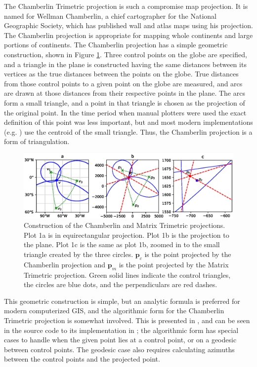 \documentclass[]{interact}
\begin{document}
The Chamberlin Trimetric projection is such a compromise map projection. It is
named for Wellman Chamberlin, a chief cartographer for the National Geographic
Society, which has published wall and atlas maps using his projection. The
Chamberlin projection is appropriate for mapping whole continents and large
portions of continents. \citep{christensen} The Chamberlin projection has a
simple geometric construction, shown in Figure \ref{fig:chamberlin}. Three
control points on the globe are specified, and a triangle in the plane is
constructed having the same distances between its vertices as the true
distances between the points on the globe. True distances from those control
points to a given point on the globe are measured, and arcs are drawn at those
distances from their respective points in the plane.
The arcs form a small triangle,
and a point in that triangle is chosen as the projection of the original
point. In the time period when manual plotters were used the exact definition
of this point was less important, but \citet{christensen} and most modern
implementations (e.g. \citealp{proj}) use the centroid of the small triangle.
Thus, the Chamberlin projection is a form of triangulation. \citep{snyder89}

\begin{figure}
  \includegraphics[width=\textwidth]{construction}
  \caption{Construction of the Chamberlin and Matrix Trimetric projections.
  Plot 1a is in equirectangular projection. Plot 1b is the projection
  to the plane. Plot 1c is the same as plot 1b, zoomed in to the small
  triangle created by the three circles. $\mathbf p_c$ is the point projected
  by the Chamberlin projection and $\mathbf p_m$ is the point projected
  by the Matrix Trimetric projection. Green solid lines indicate the control
  triangles, the circles are blue dots, and the perpendiculars are red dashes.}
  \label{fig:chamberlin}
\end{figure}

This geometric construction is simple, but an analytic formula is preferred for
modern computerized GIS, and the algorithmic form for the Chamberlin Trimetric
projection is somewhat involved. This is presented in \citet{christensen}, and
can be seen in the source code to its implementation in \citet{proj}; the
algorithmic form has special cases to handle when the given point lies at a
control point, or on a geodesic between control points. The geodesic case also
requires calculating azimuths between the control points and the projected
point.
\end{document}

